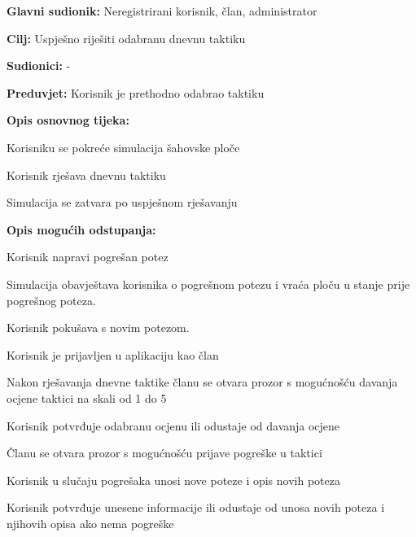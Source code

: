 					\noindent {}
					\begin{packed_item}
	
						\item \textbf{Glavni sudionik: } Neregistrirani korisnik, član, administrator
						\item  \textbf{Cilj: } Uspješno riješiti odabranu dnevnu taktiku
						\item  \textbf{Sudionici: }-
						\item  \textbf{Preduvjet: }Korisnik je prethodno odabrao taktiku
						\item  \textbf{Opis osnovnog tijeka:}
						
						\item[] \begin{packed_enum}
	
							\item Korisniku se pokreće simulacija šahovske ploče
							\item Korisnik rješava dnevnu taktiku
							\item Simulacija se zatvara po uspješnom rješavanju
							
						\end{packed_enum}
						
						\item  \textbf{Opis mogućih odstupanja:}
						
						\item[] \begin{packed_item}
	
							
							\item[2.a] Korisnik napravi pogrešan potez
							\item[] \begin{packed_enum}
								
								\item Simulacija obavještava korisnika o pogrešnom potezu i vraća ploču u stanje prije pogrešnog poteza.
								\item Korisnik pokušava s novim potezom.
								
								
							\end{packed_enum}
						
						\item[3.a] Korisnik je prijavljen u aplikaciju kao član
						\item[] \begin{packed_enum}
							
							\item Nakon rješavanja dnevne taktike članu se otvara prozor s mogućnošću davanja ocjene taktici na skali od 1 do 5
							\item Korisnik potvrđuje odabranu ocjenu ili odustaje od davanja ocjene
							\item Članu se otvara prozor s mogućnošću prijave pogreške u taktici
							\item Korisnik u slučaju pogrešaka unosi nove poteze i opis novih poteza
							\item Korisnik potvrđuje unesene informacije ili odustaje od unosa novih poteza i njihovih opisa ako nema pogreške
							

\end{packed_enum}
\end{packed_item}
\end{packed_item}
